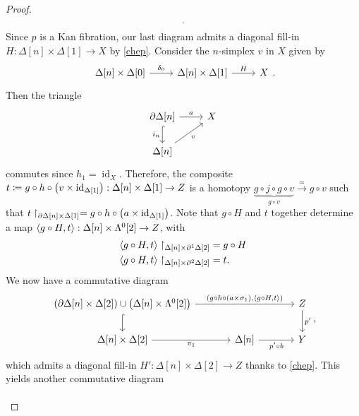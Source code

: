\documentclass[10pt,letterpaper,cm]{nupset}
\theoremstyle{definition}
\theoremstyle{theorem}
\theoremstyle{remark}
\newcommand{\0}{\mathbf{0}}
\newcommand{\1}{\mathbf{1}}
\newcommand{\2}{\mathbf{2}}
\DeclareMathOperator{\idd}{id}
\begin{document}
\begin{proof}
\[\begin{tikzcd}[column sep=large]
\end{tikzcd}.
\] Since $p$ is a Kan fibration, our last diagram admits a diagonal fill-in $H: \Delta[n] \times \Delta[1] \to X$ by \cref{chep}. Consider the $n$-simplex $v$ in $X$ given by
\[
\begin{tikzcd}
{\Delta[n]\times \Delta[0]} \arrow[r, "\delta_0"] & {\Delta[n]\times \Delta[1]} \arrow[r, "H"] & X
\end{tikzcd}.
\] Then the triangle
\[
\begin{tikzcd}
{\partial{\Delta[n]}} \arrow[d, "i_n"', hook] \arrow[r, "a"] & X \\
{\Delta[n]} \arrow[ru, "v"']                                 &  
\end{tikzcd}
\] commutes  since $h_1 = \idd_X$. Therefore, the composite $t \coloneqq g \circ h \circ \mleft(v \times \idd_{\Delta[1]}\mright): \Delta[n]\times \Delta[1] \to Z$ is a homotopy $\underbrace{g \circ j \circ g \circ v}_{g\circ v} \overset{\simeq}{\longrightarrow} g\circ v$ such that $t\restriction_{\partial{\Delta[n]}\times \Delta[1]}= g \circ h \circ\mleft(a \times \idd_{\Delta[1]}\mright)$. Note that $g\circ H$ and $t$ together determine a map $\mleft\langle g\circ H, t\mright\rangle : \Delta[n]\times \Lambda^0[2] \to Z$, with 
\begin{align*}
\mleft\langle g\circ H, t\mright\rangle\restriction_{\Delta[n] \times \partial^1{\Delta[2]}} &= g \circ H
\\ \mleft\langle g\circ H, t\mright\rangle\restriction_{\Delta[n] \times \partial^2{\Delta[2]}} &= t.
\end{align*}
We now have a commutative diagram
\[
\begin{tikzcd}[column sep=large]
{\mleft(\partial{\Delta[n]}\times \Delta[2]\mright)\cup \mleft(\Delta[n]\times \Lambda^0[2]\mright)} \arrow[d, hook] \arrow[rr, "{\mleft(g\circ h\circ \mleft(a\times \sigma_1\mright),\mleft\langle g\circ H, t\mright\rangle\mright)}"] &                                     & Z \arrow[d, "p'"] \\
{\Delta[n]\times \Delta[2]} \arrow[r, "\pi_1"']                                                                                                                                                                      & {\Delta[n]} \arrow[r, "p'\circ b"'] & Y               
\end{tikzcd}
,\] which admits a diagonal fill-in $H' : \Delta[n] \times \Delta[2] \to Z$ thanks to \cref{chep}.
This yields another commutative diagram
\[
\begin{tikzcd}[column sep=huge]

\end{tikzcd}\]
\end{proof}
\end{document}

